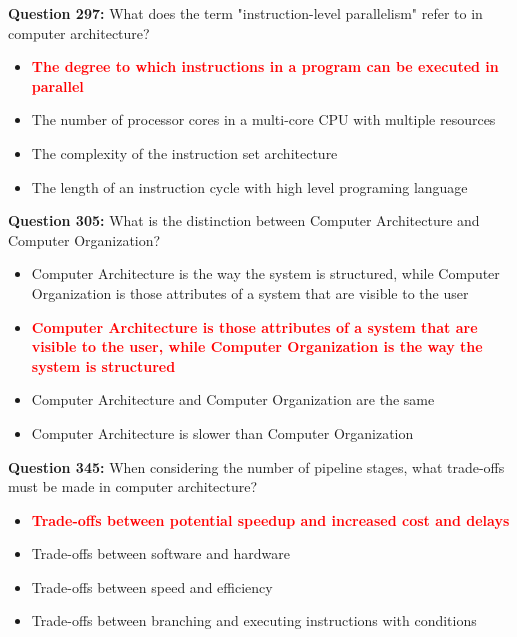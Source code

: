 \documentclass[12pt,a4paper]{article}
\begin{document}
\textbf{Question 297:} What does the term "instruction-level parallelism" refer to in computer architecture?

\begin{itemize}
    \item[\textbf{A.}] \textcolor{red}{\textbf{The degree to which instructions in a program can be executed in parallel}}
    \item[\textbf{B.}] The number of processor cores in a multi-core CPU with multiple resources
    \item[\textbf{C.}] The complexity of the instruction set architecture
    \item[\textbf{D.}] The length of an instruction cycle with high level programing language
\end{itemize}

\vspace{0.5cm}

\textbf{Question 305:} What is the distinction between Computer Architecture and Computer Organization?

\begin{itemize}
    \item[\textbf{A.}] Computer Architecture is the way the system is structured, while Computer Organization is those attributes of a system that are visible to the user
    \item[\textbf{B.}] \textcolor{red}{\textbf{Computer Architecture is those attributes of a system that are visible to the user, while Computer Organization is the way the system is structured}}
    \item[\textbf{C.}] Computer Architecture and Computer Organization are the same
    \item[\textbf{D.}] Computer Architecture is slower than Computer Organization
\end{itemize}

\vspace{0.5cm}

\textbf{Question 345:} When considering the number of pipeline stages, what trade-offs must be made in computer architecture?

\begin{itemize}
    \item[\textbf{A.}] \textcolor{red}{\textbf{Trade-offs between potential speedup and increased cost and delays}}
    \item[\textbf{B.}] Trade-offs between software and hardware
    \item[\textbf{C.}] Trade-offs between speed and efficiency
    \item[\textbf{D.}] Trade-offs between branching and executing instructions with conditions
\end{itemize}
\end{document}
